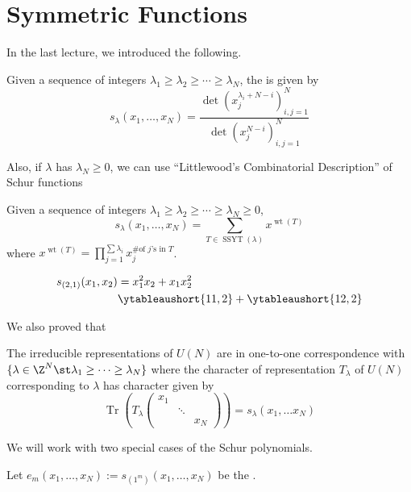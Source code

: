 \documentclass[11pt,leqno,oneside]{amsart}
\numberwithin{thm}{section}
\newcommand{\trace}{\operatorname{Tr}}
\DeclareMathOperator{\SSYT}{SSYT}
\DeclareMathOperator{\wt}{wt}
\begin{document}
\section{Symmetric Functions}
In the last lecture, we introduced the following.
\begin{defn}
  Given a sequence of integers \(\lambda_1 \geq \lambda_2 \geq \cdots
  \geq \lambda_N\), the  is given by \[
    s_\lambda(x_1, \ldots, x_N) =
    \frac{\det(x_j^{\lambda_i+N-i})_{i,j=1}^N}{\det(x_j^{N-i})_{i,j=1}^N}
  \]
\end{defn}
Also, if \(\lambda\) has \(\lambda_N \geq 0\), we can use
``Littlewood's Combinatorial Description'' of Schur functions
\begin{prop}
  Given a sequence of integers \(\lambda_1 \geq \lambda_2 \geq \cdots
  \geq \lambda_N \geq 0\), \[
    s_\lambda(x_1, \ldots, x_N) = \sum_{T \in \SSYT(\lambda)} x^{\wt(T)}
  \]
  where \(x^{\wt(T)} = \prod_{j = 1}^{\sum \lambda_i} x_j^{\# \text{
      of }j\text{'s in }T}\).
\end{prop}
\begin{example}
  \begin{align*}
    s_{(2,1)}(x_1,x_2) & = x_1^2 x_2 + x_1x_2^2 \\
    & \ytableaushort{11,2} + \ytableaushort{12,2}
  \end{align*}
\end{example}
We also proved that
\begin{thm}
  The irreducible representations of \(U(N)\) are in one-to-one
  correspondence with \(\{\lambda \in \Z^N \st \lambda_1 \geq \cdots
  \geq \lambda_N\}\) where the character of representation
  \(T_\lambda\) of 
  \(U(N)\) corresponding to \(\lambda\) has character given by
  \[
    \trace\left( T_\lambda\left(
      \begin{array}{ccc}
        x_1&&\\
           &\ddots&\\
           &&x_N
      \end{array}
    \right) \right) = s_\lambda(x_1, \ldots x_N)
  \]
\end{thm}
We will work with two special cases of the Schur polynomials.
\begin{defn}
  Let \(e_m(x_1, \ldots, x_N) := s_{(1^m)}(x_1, \ldots, x_N)\) be the
  . 
\end{defn}
\end{document}
